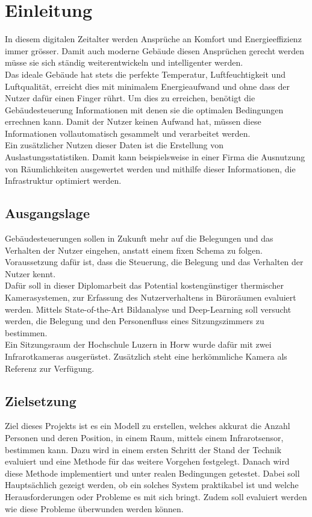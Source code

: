 \chapter{Einleitung}

In diesem digitalen Zeitalter werden Ansprüche an Komfort und Energieeffizienz immer grösser. Damit auch moderne Gebäude diesen Ansprüchen gerecht werden müsse sie sich ständig weiterentwickeln und intelligenter werden.\\
Das ideale Gebäude hat stets die perfekte Temperatur, Luftfeuchtigkeit und Luftqualität, erreicht dies mit minimalem Energieaufwand und ohne dass der Nutzer dafür einen Finger rührt. Um dies zu erreichen, benötigt die Gebäudesteuerung Informationen mit denen sie die optimalen Bedingungen errechnen kann. Damit der Nutzer keinen Aufwand hat, müssen diese Informationen vollautomatisch gesammelt und verarbeitet werden.\\
Ein zusätzlicher Nutzen dieser Daten ist die Erstellung von Auslastungsstatistiken. Damit kann beispielsweise in einer Firma die Ausnutzung von Räumlichkeiten ausgewertet werden und mithilfe dieser Informationen, die Infrastruktur optimiert werden.

\section{Ausgangslage}
\label{sec:Ausgangslage}

Gebäudesteuerungen sollen in Zukunft mehr auf die Belegungen und das Verhalten der Nutzer eingehen, anstatt einem fixen Schema zu folgen. Voraussetzung dafür ist, dass die Steuerung, die Belegung und das Verhalten der Nutzer kennt.\\
Dafür soll in dieser Diplomarbeit das Potential kostengünstiger thermischer Kamerasystemen, zur Erfassung des Nutzerverhaltens in Büroräumen evaluiert werden. Mittels State-of-the-Art Bildanalyse und Deep-Learning soll versucht werden, die Belegung und den Personenfluss eines Sitzungszimmers zu bestimmen.\\
Ein Sitzungsraum der Hochschule Luzern in Horw wurde dafür mit zwei Infrarotkameras ausgerüstet. Zusätzlich steht eine herkömmliche Kamera als Referenz zur Verfügung.


\section{Zielsetzung}
\label{sec:Zielsetzung}

Ziel dieses Projekts ist es ein Modell zu erstellen, welches akkurat die Anzahl Personen und deren Position, in einem Raum, mittels einem Infrarotsensor, bestimmen kann. Dazu wird in einem ersten Schritt der Stand der Technik evaluiert und eine Methode für das weitere Vorgehen festgelegt. Danach wird diese Methode implementiert und unter realen Bedingungen getestet. Dabei soll Hauptsächlich gezeigt werden, ob ein solches System praktikabel ist und welche Herausforderungen oder Probleme es mit sich bringt. Zudem soll evaluiert werden wie diese Probleme überwunden werden können.


